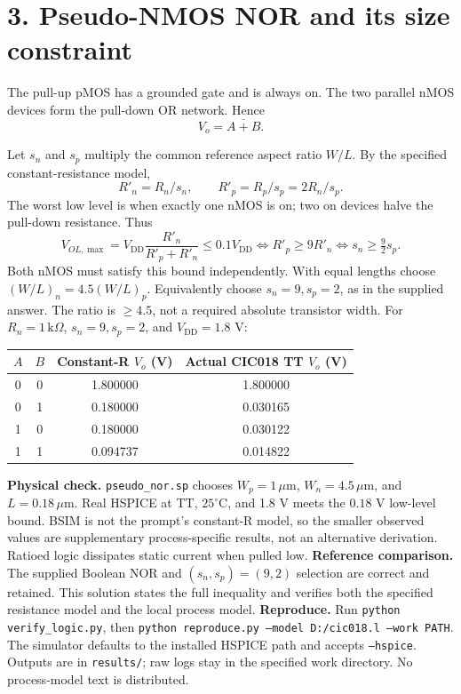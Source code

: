 \documentclass[11pt,a4paper]{article}
\newcommand{\VDD}{V_{\mathrm{DD}}}
\newcommand{\VSS}{V_{\mathrm{SS}}}
\newcommand{\MOS}[5]{
  \coordinate (#1) at (#2,#3);
  \coordinate (#1t) at ($(#1)+(0,.55)$);
  \coordinate (#1b) at ($(#1)+(0,-.55)$);
  \draw (#1t)--($(#1)+(0,.30)$)--($(#1)+(-.18,.30)$);
  \draw ($(#1)+(-.18,.34)$)--($(#1)+(-.18,-.34)$);
  \draw ($(#1)+(-.18,-.30)$)--($(#1)+(0,-.30)$)--(#1b);
  \draw ($(#1)+(-.35,.33)$)--($(#1)+(-.35,-.33)$);
  \def\type{#5}\def\ptype{p}
  \ifx\type\ptype
    \draw ($(#1)+(-.78,0)$)--($(#1)+(-.53,0)$);
    \draw ($(#1)+(-.465,0)$) circle (.065);
    \draw ($(#1)+(-.40,0)$)--($(#1)+(-.35,0)$);
  \else
    \draw ($(#1)+(-.78,0)$)--($(#1)+(-.35,0)$);
  \fi
  \node[anchor=east] at ($(#1)+(-.82,0)$) {$#4$};
  \node[anchor=west,font=\scriptsize] at ($(#1)+(.10,0)$) {#1};
}
\begin{document}
\section*{3. Pseudo-NMOS NOR and its size constraint}
The pull-up pMOS has a grounded gate and is always on. The two parallel nMOS devices form the pull-down OR network. Hence
\[
 \boxed{V_o=\overline{A+B}}.
\]
\begin{center}\end{center}
Let $s_n$ and $s_p$ multiply the common reference aspect ratio $W/L$. By the specified constant-resistance model,
\[
 R'_n=R_n/s_n,\qquad R'_p=R_p/s_p=2R_n/s_p.
\]
The worst low level is when exactly one nMOS is on; two on devices halve the pull-down resistance. Thus
\[
 V_{OL,\max}=\VDD\frac{R'_n}{R'_p+R'_n}\le0.1\VDD
 \iff R'_p\ge9R'_n
 \iff \boxed{s_n\ge\tfrac92 s_p.}
\]
Both nMOS must satisfy this bound independently. With equal lengths choose $(W/L)_n=4.5(W/L)_p$. Equivalently choose $s_n=9,s_p=2$, as in the supplied answer. The ratio is $\ge4.5$, not a required absolute transistor width.
For $R_n=1\,\mathrm{k}\Omega$, $s_n=9,s_p=2$, and $\VDD=1.8$ V:
\begin{center}\begin{tabular}{cc|cc}\toprule
$A$&$B$&Constant-R $V_o$ (V)&Actual CIC018 TT $V_o$ (V)\\\midrule
0&0&1.800000&1.800000\\0&1&0.180000&0.030165\\
1&0&0.180000&0.030122\\1&1&0.094737&0.014822\\\bottomrule
\end{tabular}\end{center}
\textbf{Physical check.} \texttt{pseudo\_nor.sp} chooses $W_p=1\,\mu$m, $W_n=4.5\,\mu$m, and $L=0.18\,\mu$m. Real HSPICE at TT, $25^\circ$C, and 1.8 V meets the $0.18$ V low-level bound. BSIM is not the prompt's constant-R model, so the smaller observed values are supplementary process-specific results, not an alternative derivation. Ratioed logic dissipates static current when pulled low.
\textbf{Reference comparison.} The supplied Boolean NOR and $(s_n,s_p)=(9,2)$ selection are correct and retained. This solution states the full inequality and verifies both the specified resistance model and the local process model.
\textbf{Reproduce.} Run \texttt{python verify\_logic.py}, then \texttt{python reproduce.py --model D:/cic018.l --work PATH}. The simulator defaults to the installed HSPICE path and accepts \texttt{--hspice}. Outputs are in \texttt{results/}; raw logs stay in the specified work directory. No process-model text is distributed.
\end{document}
